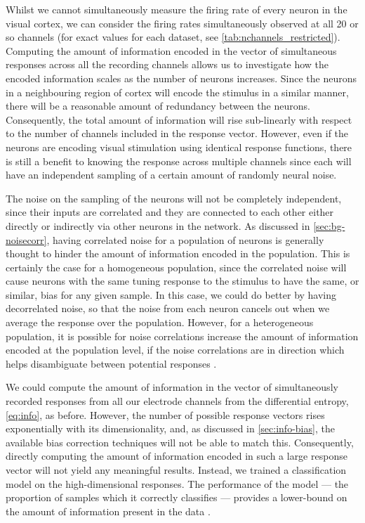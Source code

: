 Whilst we cannot simultaneously measure the firing rate of every neuron in the visual cortex, we can consider the firing rates simultaneously observed at all \num{20} or so channels (for exact values for each dataset, see \autoref{tab:nchannels_restricted}).
Computing the amount of information encoded in the vector of simultaneous responses across all the recording channels allows us to investigate how the encoded information scales as the number of neurons increases.
Since the neurons in a neighbouring region of cortex will encode the stimulus in a similar manner, there will be a reasonable amount of redundancy between the neurons.
Consequently, the total amount of information will rise sub-linearly with respect to the number of channels included in the response vector.
However, even if the neurons are encoding visual stimulation using identical response functions, there is still a benefit to knowing the response across multiple channels since each will have an independent sampling of a certain amount of randomly neural noise.

The noise on the sampling of the neurons will not be completely independent, since their inputs are correlated and they are connected to each other either directly or indirectly via other neurons in the network.
As discussed in \autoref{sec:bg-noisecorr}, having correlated noise for a population of neurons is generally thought to hinder the amount of information encoded in the population.
This is certainly the case for a homogeneous population, since the correlated noise will cause neurons with the same tuning response to the stimulus to have the same, or similar, bias for any given sample.
In this case, we could do better by having decorrelated noise, so that the noise from each neuron cancels out when we average the response over the population.
However, for a heterogeneous population, it is possible for noise correlations increase the amount of information encoded at the population level, if the noise correlations are in direction which helps disambiguate between potential responses \citep{Averbeck2006,Moreno-Bote2014}.

We could compute the amount of information in the vector of simultaneously recorded responses from all our electrode channels from the differential entropy, \autoref{eq:info}, as before.
However, the number of possible response vectors rises exponentially with its dimensionality, and, as discussed in \autoref{sec:info-bias}, the available bias correction techniques will not be able to match this.
Consequently, directly computing the amount of information encoded in such a large response vector will not yield any meaningful results.
Instead, we trained a classification model on the high-dimensional responses.
The performance of the model --- the proportion of samples which it correctly classifies --- provides a lower-bound on the amount of information present in the data \citep{Quiroga2009}.

